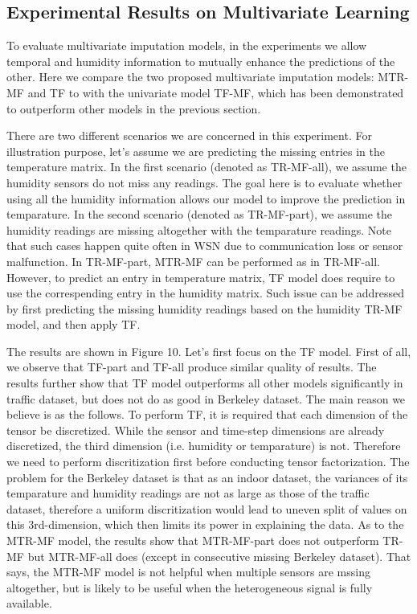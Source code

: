 \subsection{Experimental Results on Multivariate Learning}

To evaluate multivariate imputation models, in the experiments we allow temporal and humidity information to mutually enhance the predictions of the other. Here we compare the two proposed multivariate imputation models: MTR-MF and TF to with the univariate model TF-MF, which has been demonstrated to outperform other models in the previous section. 

There are two different scenarios we are concerned in this experiment. For illustration purpose, let's assume we are predicting the missing entries in the temperature matrix. In the first scenario (denoted as TR-MF-all), we assume the humidity sensors do not miss any readings. The goal here is to evaluate whether using all the humidity information allows our model to improve the prediction in temparature. In the second scenario (denoted as TR-MF-part), we assume the humidity readings are missing altogether with the temparature readings. Note that such cases happen quite often in WSN due to communication loss or sensor malfunction. In TR-MF-part, MTR-MF can be performed as in TR-MF-all. However, to predict an entry in temperature matrix, TF model does require to use the correspending entry in the humidity matrix. Such issue can be addressed by first predicting the missing humidity readings based on the humidity TR-MF model, and then apply TF.

The results are shown in Figure 10. Let's first focus on the TF model. First of all, we observe that TF-part and TF-all produce similar quality of results. The results further show that TF model outperforms all other models significantly in traffic dataset, but does not do as good in Berkeley dataset. The main reason we believe is as the follows. To perform TF, it is required that each dimension of the tensor be discretized. While the sensor and time-step dimensions are already discretized, the third dimension (i.e. humidity or temparature) is not. Therefore we need to perform discritization first before conducting tensor factorization. The problem for the Berkeley dataset is that as an indoor dataset, the variances of its temparature and humidity readings are not as large as those of the traffic dataset, therefore a uniform discritization would lead to uneven split of values on this 3rd-dimension, which then limits its power in explaining the data.  
As to the MTR-MF model, the results show that MTR-MF-part does not outperform TR-MF but MTR-MF-all does (except in consecutive missing Berkeley dataset). That says, the MTR-MF model is not helpful when multiple sensors are mssing altogether, but is likely to be useful when the heterogeneous signal is fully available. 

